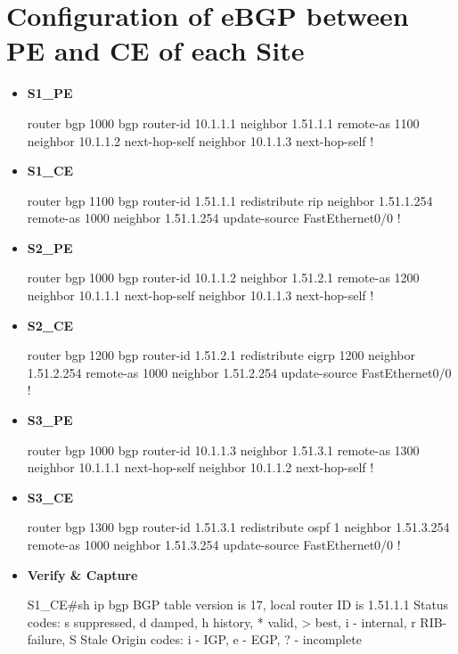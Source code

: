 \documentclass[10pt]{article}
\begin{document}
\section{Configuration of eBGP between PE and CE of each Site} %
\label{sec:configuration_of_ebgp_between_pe_and_ce_of_each_site}
\begin{itemize}
	\item {\bf S1\_PE}
	\begin{verbatim*}
		router bgp 1000
		 bgp router-id 10.1.1.1
		 neighbor 1.51.1.1 remote-as 1100
		 neighbor 10.1.1.2 next-hop-self
		 neighbor 10.1.1.3 next-hop-self
		!
	\end{verbatim*}
	\item {\bf S1\_CE}
	\begin{verbatim*}
		router bgp 1100
		 bgp router-id 1.51.1.1
		 redistribute rip
		 neighbor 1.51.1.254 remote-as 1000
		 neighbor 1.51.1.254 update-source FastEthernet0/0
		!
	\end{verbatim*}
	\item {\bf S2\_PE}
	\begin{verbatim*}
		router bgp 1000
		 bgp router-id 10.1.1.2
		 neighbor 1.51.2.1 remote-as 1200
		 neighbor 10.1.1.1 next-hop-self
		 neighbor 10.1.1.3 next-hop-self
		!
	\end{verbatim*}
	\item {\bf S2\_CE}
	\begin{verbatim*}
		router bgp 1200
		 bgp router-id 1.51.2.1
		 redistribute eigrp 1200
		 neighbor 1.51.2.254 remote-as 1000
		 neighbor 1.51.2.254 update-source FastEthernet0/0
		!
	\end{verbatim*}
	\item {\bf S3\_PE}
	\begin{verbatim*}
		router bgp 1000
		 bgp router-id 10.1.1.3
		 neighbor 1.51.3.1 remote-as 1300
		 neighbor 10.1.1.1 next-hop-self
		 neighbor 10.1.1.2 next-hop-self
		!
	\end{verbatim*}
	\item {\bf S3\_CE}
	\begin{verbatim*}
		router bgp 1300
		 bgp router-id 1.51.3.1
		 redistribute ospf 1
		 neighbor 1.51.3.254 remote-as 1000
		 neighbor 1.51.3.254 update-source FastEthernet0/0
		!
	\end{verbatim*}
	\item {\bf Verify \& Capture}
	\begin{verbatim*}
		S1_CE#sh ip bgp
		BGP table version is 17, local router ID is 1.51.1.1
		Status codes: s suppressed, d damped, h history, * valid, > best, i - internal,
		              r RIB-failure, S Stale
		Origin codes: i - IGP, e - EGP, ? - incomplete


\end{verbatim*}
\end{itemize}
\end{document}
